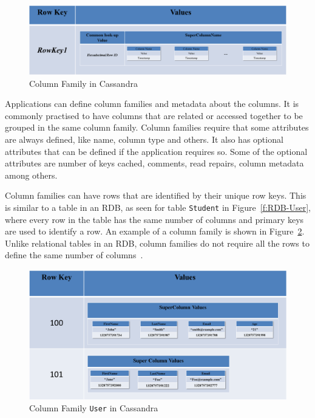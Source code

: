 \begin{figure}[H]
	\centering
	\includegraphics[width=\textwidth]{./figure/Example/ColumnFamily.png}
	\caption{Column Family in Cassandra}\label{f:columnfamily}
\end{figure}

Applications can define column families and metadata about the columns. 
It is commonly practised to have columns that are related or accessed
together to be grouped in the same column family.  Column families require that
some attributes are always defined,   like name,   column type and others.  It
also has optional attributes that can be defined if the application requires so.
 Some of the optional attributes are number of keys cached,   comments,   read
repairs,   column metadata among others.

Column families can have rows %
that are identified by their unique row keys.  This is similar to a table in an
\ac{RDB}, as seen for table \texttt{Student} in Figure~\ref{f:RDB-User},   where
every row in the table has the same number of columns and primary keys are used
to identify a row.  An example of a column family is shown in
Figure~\ref{f:columnfamilyUSER}.
Unlike relational tables in an \ac{RDB},   column families do not require all
the rows to define the same number of columns~\citep{datastaxDataModel,BOOK}.

\begin{figure}[h]
	\centering
	\includegraphics[width=\textwidth]{./figure/Example/ColumnFamily-User-DiffColumns.png}
	\caption{Column Family \texttt{User} in Cassandra}\label{f:columnfamilyUSER}
\end{figure}

